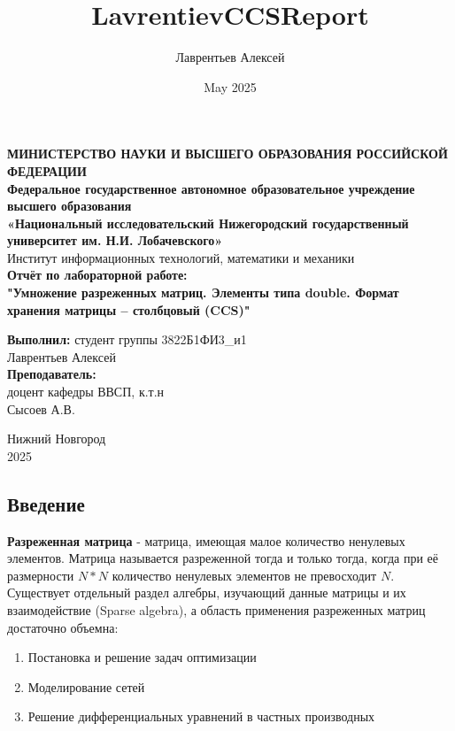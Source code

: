 \documentclass[12pt]{article}
\title{LavrentievCCSReport}
\author{Лаврентьев Алексей}
\date{May 2025}
\begin{document}
\begin{titlepage}
\begin{center}
\textbf{МИНИСТЕРСТВО НАУКИ И ВЫСШЕГО ОБРАЗОВАНИЯ РОССИЙСКОЙ ФЕДЕРАЦИИ} \\
\textbf{Федеральное государственное автономное образовательное учреждение высшего образования \\ «Национальный исследовательский Нижегородский государственный университет им. Н.И. Лобачевского»} \\
Институт информационных технологий, математики и механики \\
\vspace{3cm}
{\Large
\textbf{Отчёт по лабораторной работе:} \\[0.5cm]
\textbf{"Умножение разреженных матриц. Элементы типа double. Формат хранения матрицы – столбцовый (CCS)"} \\
}
\vspace{2cm}
\begin{flushright}
\textbf{Выполнил:} студент группы 3822Б1ФИ3\_и1\\
Лаврентьев Алексей \\
\vspace{0.5cm}
\textbf{Преподаватель:} \\
доцент кафедры ВВСП, к.т.н \\ Сысоев А.В.
\end{flushright}
\vspace{2.5cm}
Нижний Новгород \\
2025
\end{center}
\end{titlepage}
\begin{center}
    \section*{Введение}
\end{center}
\textbf{Разреженная матрица} - матрица, имеющая малое количество ненулевых элементов. Матрица называется разреженной тогда и только тогда, когда при её размерности $N*N$ количество ненулевых элементов не превосходит $N$. Существует отдельный раздел алгебры, изучающий данные матрицы и их взаимодействие (Sparse algebra), а область применения разреженных матриц достаточно объемна: 
\begin{enumerate}
    \item Постановка и решение задач оптимизации
    \item Моделирование сетей
    \item Решение дифференциальных уравнений в частных производных
\end{enumerate}
\end{document}

